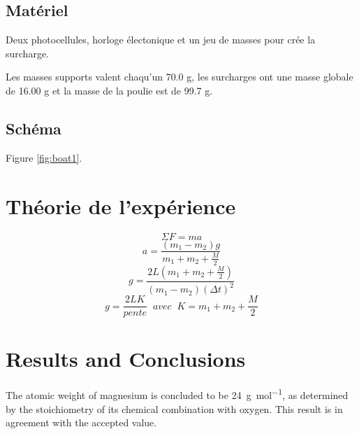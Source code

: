 \documentclass{article}
\begin{document}
\subsection{Matériel}
\begin{matériel_schéma}
Deux photocellules, horloge électonique et un jeu de masses pour crée la surcharge.

Les masses supports valent chaqu'un 70.0 g, les surcharges ont une masse globale de 16.00 g et la masse de la poulie est de 99.7 g.
\end{matériel_schéma}

\subsection{Schéma}


Figure \ref{fig:boat1}.

\section{Théorie de l'expérience}

\begin{equation}
    \Sigma F = ma

\end{equation}
\begin{equation} a = \frac{(m_{1} - m_{2})g}{m_{1} + m_{2} + \frac{M}{2}} \end{equation}
\begin{equation} g = \frac{2L(m_{1} + m_{2} + \frac{M}{2})}{(m_{1} - m_{2})({\Delta}t)^2}\end{equation}
\begin{equation} g = \frac{2LK}{pente} \; \; avec \; \; K = m_{1} + m_{2} + \frac{M}{2}\end{equation}




\section{Results and Conclusions}

The atomic weight of magnesium is concluded to be \SI{24}{\gram\per\mol}, as determined by the stoichiometry of its chemical combination with oxygen. This result is in agreement with the accepted value.
\end{document}
